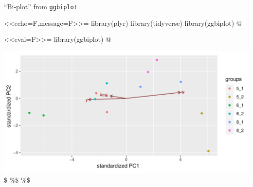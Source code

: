 \documentclass[ignorenonframetext,]{beamer}
\newenvironment{Shaded}{\begin{snugshade}}{\end{snugshade}}
\newcommand{\DataTypeTok}[1]{\textcolor[rgb]{0.13,0.29,0.53}{#1}}
\newcommand{\FloatTok}[1]{\textcolor[rgb]{0.00,0.00,0.81}{#1}}
\newcommand{\KeywordTok}[1]{\textcolor[rgb]{0.13,0.29,0.53}{\textbf{#1}}}
\newcommand{\NormalTok}[1]{#1}
\newcommand{\OperatorTok}[1]{\textcolor[rgb]{0.81,0.36,0.00}{\textbf{#1}}}
\begin{document}
\begin{frame}[fragile]{``Bi-plot'' from \texttt{ggbiplot}}
\protect\hypertarget{bi-plot-from-ggbiplot}{}

\textless{}\textless{}echo=F,message=F\textgreater{}\textgreater{}=
library(plyr) library(tidyverse) library(ggbiplot) @

\textless{}\textless{}eval=F\textgreater{}\textgreater{}=
library(ggbiplot) @

\begin{Shaded}
\end{Shaded}

\includegraphics{figure/unnamed-chunk-289-1.pdf} \$ \%\$ \%\$

\end{frame}
\end{document}
